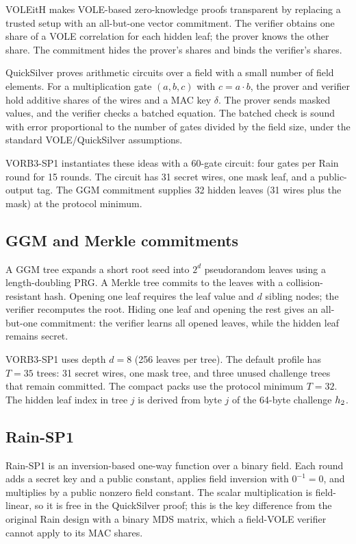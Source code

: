 \documentclass[11pt,a4paper]{article}
\begin{document}
VOLEitH makes VOLE-based zero-knowledge proofs transparent by replacing a
trusted setup with an all-but-one vector commitment. The verifier obtains one
share of a VOLE correlation for each hidden leaf; the prover knows the other
share. The commitment hides the prover's shares and binds the verifier's
shares.

QuickSilver proves arithmetic circuits over a field with a small number of
field elements. For a multiplication gate $(a,b,c)$ with $c=a\cdot b$, the
prover and verifier hold additive shares of the wires and a MAC key $\delta$.
The prover sends masked values, and the verifier checks a batched equation.
The batched check is sound with error proportional to the number of gates
divided by the field size, under the standard VOLE/QuickSilver assumptions.

VORB3-SP1 instantiates these ideas with a 60-gate circuit: four gates per
Rain round for 15 rounds. The circuit has 31 secret wires, one mask leaf, and
a public-output tag. The GGM commitment supplies 32 hidden leaves (31 wires
plus the mask) at the protocol minimum.

\subsection{GGM and Merkle commitments}

A GGM tree expands a short root seed into $2^d$ pseudorandom leaves using a
length-doubling PRG. A Merkle tree commits to the leaves with a collision-
resistant hash. Opening one leaf requires the leaf value and $d$ sibling
nodes; the verifier recomputes the root. Hiding one leaf and opening the rest
gives an all-but-one commitment: the verifier learns all opened leaves, while
the hidden leaf remains secret.

VORB3-SP1 uses depth $d=8$ (256 leaves per tree). The default profile has
$T=35$ trees: 31 secret wires, one mask tree, and three unused challenge
trees that remain committed. The compact packs use the protocol minimum
$T=32$. The hidden leaf index in tree $j$ is derived from byte $j$ of the
64-byte challenge $h_2$.

\subsection{Rain-SP1}

Rain-SP1 is an inversion-based one-way function over a binary field. Each
round adds a secret key and a public constant, applies field inversion with
$0^{-1}=0$, and multiplies by a public nonzero field constant. The scalar
multiplication is field-linear, so it is free in the QuickSilver proof; this
is the key difference from the original Rain design with a binary MDS matrix,
which a field-VOLE verifier cannot apply to its MAC shares.
\end{document}
